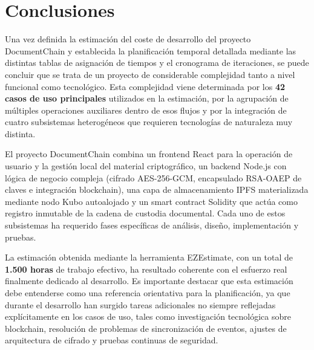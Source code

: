 \documentclass[11pt, a4paper]{article}
\begin{document}
\section{Conclusiones}

Una vez definida la estimación del coste de desarrollo del proyecto DocumentChain y establecida la planificación temporal detallada mediante las distintas tablas de asignación de tiempos y el cronograma de iteraciones, se puede concluir que se trata de un proyecto de considerable complejidad tanto a nivel funcional como tecnológico. Esta complejidad viene determinada por los \textbf{42 casos de uso principales} utilizados en la estimación, por la agrupación de múltiples operaciones auxiliares dentro de esos flujos y por la integración de cuatro subsistemas heterogéneos que requieren tecnologías de naturaleza muy distinta.

El proyecto DocumentChain combina un frontend React para la operación de usuario y la gestión local del material criptográfico, un backend Node.js con lógica de negocio compleja (cifrado AES-256-GCM, encapsulado RSA-OAEP de claves e integración blockchain), una capa de almacenamiento IPFS materializada mediante nodo Kubo autoalojado y un smart contract Solidity que actúa como registro inmutable de la cadena de custodia documental. Cada uno de estos subsistemas ha requerido fases específicas de análisis, diseño, implementación y pruebas.

La estimación obtenida mediante la herramienta EZEstimate, con un total de \textbf{1.500 horas} de trabajo efectivo, ha resultado coherente con el esfuerzo real finalmente dedicado al desarrollo. Es importante destacar que esta estimación debe entenderse como una referencia orientativa para la planificación, ya que durante el desarrollo han surgido tareas adicionales no siempre reflejadas explícitamente en los casos de uso, tales como investigación tecnológica sobre blockchain, resolución de problemas de sincronización de eventos, ajustes de arquitectura de cifrado y pruebas continuas de seguridad.
\end{document}
